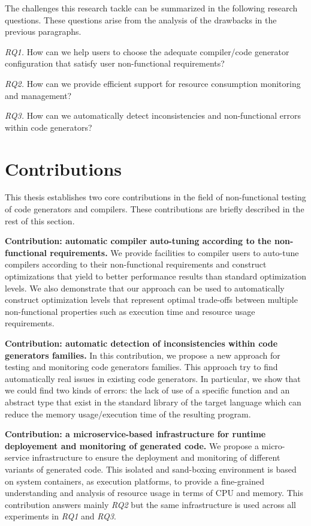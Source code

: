 The challenges this research tackle can be summarized in the following research
questions. These questions arise from the analysis of the drawbacks in the previous paragraphs.

\textit{RQ1.} How can we help users to choose the adequate compiler/code generator configuration that satisfy user non-functional requirements?

\textit{RQ2.} How can we provide efficient support for resource consumption monitoring and management?

\textit{RQ3.} How can we automatically detect inconsistencies and non-functional errors within code generators?



\section*{Contributions}
This thesis establishes two core contributions in the field of non-functional testing of code generators and compilers. 
These contributions are briefly described in the rest of this section.

\textbf{Contribution: automatic compiler auto-tuning according to the non-functional requirements.}
We provide facilities to compiler users to auto-tune compilers according to their non-functional requirements and construct optimizations that
yield to better performance results than standard optimization levels. We also demonstrate that our approach can be used to automatically construct optimization levels that represent optimal trade-offs between multiple non-functional properties such as execution time and resource usage requirements.

\textbf{Contribution: automatic detection of inconsistencies within code generators families.}
In this contribution, we propose a new approach for testing and
monitoring code generators families. This approach try to find automatically real issues in existing code generators. In particular, we show that we could find two kinds of errors: the lack of use of a specific function and an abstract type that exist in the standard library of the target language which can reduce the memory usage/execution time of the resulting program.

\textbf{Contribution: a microservice-based infrastructure for runtime deployement and monitoring of generated code.}
We propose a micro-service infrastructure to ensure the deployment and monitoring of different variants of generated code. This isolated and sand-boxing environment is based on system containers, as execution platforms, to provide a fine-grained understanding and analysis of resource usage in terms of CPU and memory. This contribution answers mainly \textit{RQ2} but the same infrastructure is used across all experiments in \textit{RQ1} and \textit{RQ3}.

